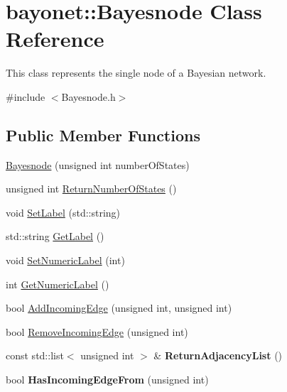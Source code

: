 \hypertarget{classbayonet_1_1_bayesnode}{\section{bayonet\-:\-:Bayesnode Class Reference}
\label{classbayonet_1_1_bayesnode}
}


This class represents the single node of a Bayesian network.  




{\ttfamily \#include $<$Bayesnode.\-h$>$}

\subsection*{Public Member Functions}
\begin{DoxyCompactItemize}
\item 
\hyperlink{classbayonet_1_1_bayesnode_a2b676188453fbbb4dc96be714ac931d3}{Bayesnode} (unsigned int number\-Of\-States)
\item 
unsigned int \hyperlink{classbayonet_1_1_bayesnode_a24d38b28413a60938ea7fad7c74e823d}{Return\-Number\-Of\-States} ()
\item 
void \hyperlink{classbayonet_1_1_bayesnode_abaa27f1597d5599344e3a4d82e7b64b0}{Set\-Label} (std\-::string)
\item 
std\-::string \hyperlink{classbayonet_1_1_bayesnode_aebe7f411efe8b8647ed6f7d28f700638}{Get\-Label} ()
\item 
void \hyperlink{classbayonet_1_1_bayesnode_adbda396fa53b6923a69824c98fce9ca1}{Set\-Numeric\-Label} (int)
\item 
int \hyperlink{classbayonet_1_1_bayesnode_a347df4c4cac0f04f6b263a3523ea37d5}{Get\-Numeric\-Label} ()
\item 
bool \hyperlink{classbayonet_1_1_bayesnode_a123ac9e1e30d69c6037eb9ea9562adbb}{Add\-Incoming\-Edge} (unsigned int, unsigned int)
\item 
bool \hyperlink{classbayonet_1_1_bayesnode_a9614959ba778d25d7679e8fcad20c75d}{Remove\-Incoming\-Edge} (unsigned int)
\item 
\hypertarget{classbayonet_1_1_bayesnode_ad20de796507c48523bcf49fffdc7b3d5}{const std\-::list$<$ unsigned int $>$ \& {\bfseries Return\-Adjacency\-List} ()}\label{classbayonet_1_1_bayesnode_ad20de796507c48523bcf49fffdc7b3d5}

\item 
\hypertarget{classbayonet_1_1_bayesnode_a37445ad6877e51f911a3a2228bd9c417}{bool {\bfseries Has\-Incoming\-Edge\-From} (unsigned int)}\label{classbayonet_1_1_bayesnode_a37445ad6877e51f911a3a2228bd9c417}


\end{DoxyCompactItemize}
